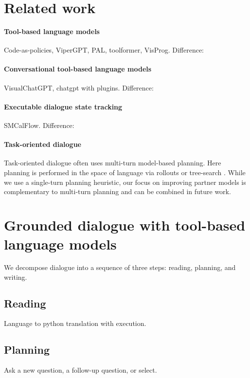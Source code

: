 \documentclass[11pt]{article}
\begin{document}
\section{Related work}

\paragraph{Tool-based language models}
Code-as-policies, ViperGPT, PAL, toolformer, VisProg.
Difference: 

\paragraph{Conversational tool-based language models}
VisualChatGPT, chatgpt with plugins.
Difference:

\paragraph{Executable dialogue state tracking}
SMCalFlow.
Difference:

\paragraph{Task-oriented dialogue}
Task-oriented dialogue often uses multi-turn model-based planning.
Here planning is performed in the space of language via rollouts or tree-search
\citep{dnd,yarats2017rollout,ingress,jang2020bapomdp}.
While we use a single-turn planning heuristic,
our focus on improving partner models is complementary to multi-turn planning and can be combined in future work.


\section{Grounded dialogue with tool-based language models}
We decompose dialogue into a sequence of three steps: reading, planning, and writing.

\subsection{Reading}
Language to python translation with execution.

\subsection{Planning}
Ask a new question, a follow-up question, or select.
\end{document}
